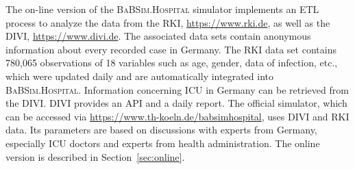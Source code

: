 \documentclass[conference]{IEEEtran}
\newcommand{\babsimhospital}{\textsc{BaBSim.Hospital}\xspace}
\begin{document}
The on-line version of the \babsimhospital simulator implements an \gls{ETL} process to analyze the data from the \gls{RKI}, \url{https://www.rki.de}, as well as the \gls{DIVI}, \url{https://www.divi.de}.
The associated data sets contain anonymous information about every recorded case in Germany. The \gls{RKI} data set contains 
780,065 observations of 18 variables such as age, gender, data of infection, etc., which were updated daily and are automatically integrated into \babsimhospital. 
Information concerning \gls{ICU} in Germany can be retrieved from the \gls{DIVI}.
\gls{DIVI} provides an API and a daily report. 
The official simulator, which can be accessed via \url{https://www.th-koeln.de/babsimhospital}, uses \gls{DIVI} and \gls{RKI} data.
Its parameters are based on discussions with experts from Germany, especially \gls{ICU} doctors and experts from health administration.
The online version is described in Section~\ref{sec:online}.
\end{document}
